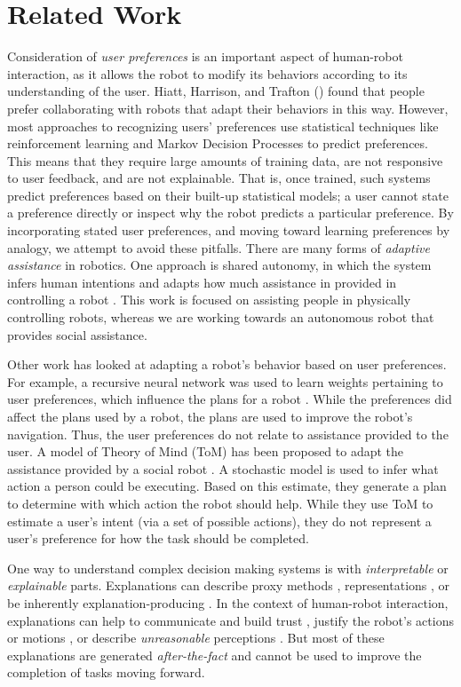 \documentclass[letterpaper]{article} %
\begin{document}
\section{Related Work}
Consideration of \textit{user preferences} is an important aspect of human-robot interaction, as it allows the robot to modify its behaviors according to its understanding of the user. Hiatt, Harrison, and Trafton (\citeyear{hiatt2011accommodating}) found that people prefer collaborating with robots that adapt their behaviors in this way. However, most approaches to recognizing users' preferences use statistical techniques like reinforcement learning \cite{woodworth2018preference} and Markov Decision Processes \cite{munzer2017preference} to predict preferences. This means that they require large amounts of training data, are not responsive to user feedback, and are not explainable. That is, once trained, such systems predict preferences based on their built-up statistical models; a user cannot state a preference directly or inspect why the robot predicts a particular preference. By incorporating stated user preferences, and moving toward learning preferences by analogy, we attempt to avoid these pitfalls.  There are many forms of \textit{adaptive assistance} in robotics.  One approach is
shared autonomy, in which the system infers human intentions and adapts how
much assistance in provided in controlling a robot \cite{Nikolaidis2017,Jain2019}.
This work is focused on assisting people in physically controlling robots,
whereas we are working towards an autonomous robot that provides social assistance.

Other work has looked at adapting a robot's behavior based on user preferences.
For example, a recursive neural network was used
to learn weights pertaining to user preferences, which influence the plans for
a robot \cite{Bacciu2014}.  While the preferences did affect the plans used by a robot,
the plans are used to improve the
robot's navigation.  Thus, the user preferences do not relate to assistance
provided to the user.  A model of Theory of Mind (ToM) has been proposed to adapt the assistance provided
by a social robot \cite{Gorur2017}.  A stochastic model is used to infer what action a person could
be executing.  Based on this estimate, they generate a plan to determine with which
action the robot should help.
While they use ToM to estimate a user's intent (via a set of possible actions),
they do not represent a user's preference for how the task should be completed.


One way to understand complex decision making systems is with
\emph{interpretable} or \emph{explainable} parts.  Explanations can describe
proxy methods \cite{why-trust,grad-cam,visualizing}, representations
\cite{netdissect2017,cavs}, or be inherently explanation-producing
\cite{multimodal}.
In the context
of human-robot interaction, explanations can help to communicate and
build trust \cite{wang2016trust}, justify the robot's actions
\cite{stange2020effects} or motions \cite{dragan2013legibility}, or
describe \emph{unreasonable} perceptions \cite{gilpin-hri}.  But most of
these explanations are generated \emph{after-the-fact} and cannot be used
to improve the completion of tasks moving forward.
\end{document}
